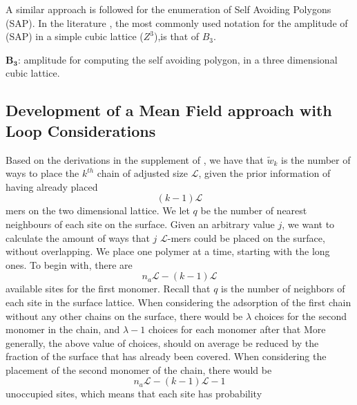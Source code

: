 \documentclass[12pt,letterpaper]{article}
\newcommand{\leng}{\mathcal{L}}
\begin{document}
\begin{tcolorbox}
A similar approach \cite{guttmann2009polygons} is followed for the enumeration of Self Avoiding Polygons (SAP). In the literature \cite{guttmann2009polygons}, the most commonly used notation for the amplitude of (SAP) in a simple cubic lattice ($Z^3$),is that of $B_3$.
\end{tcolorbox}

$\boldsymbol{B_3}$: amplitude for computing the self avoiding polygon, in a three dimensional cubic lattice.

\subsection{Development of a Mean Field approach with Loop Considerations}

Based on the derivations in the supplement of  \cite{koumarianos2021theory}, we have that $\tilde{w}_k$ is the number of ways to place the $k^{th}$ chain of adjusted size $\leng$, given the prior information of having already placed
%
$$
(k-1)\leng
$$
%
mers on the two dimensional lattice. We let $q$ be the number of nearest neighbours of each site on the surface. 
%
%
%
Given an arbitrary value $j$, we want to calculate the amount of ways that $j$ $\leng$-mers could be placed on the surface, without overlapping.
%
We place one polymer at a time, starting with the long ones.
%
%
To begin with, there are
$$
n_a\leng-(k-1)\leng
$$
available sites for the first monomer. 
%
Recall that  $q$ is the number of neighbors of each site in the surface lattice.
%
When considering the adsorption of the first chain without any other chains on the surface, there would be $\lambda$ choices for the second monomer in the chain,
and $\lambda-1$ choices for each monomer after that 
%
%
More generally, the above value of choices, should on average be reduced by the fraction of the surface that has already been covered.
%
When considering the placement of the second monomer of the chain, there would be
$$
n_a\leng-(k-1)\leng-1
$$
unoccupied sites, which means that each site has probability 
\end{document}
